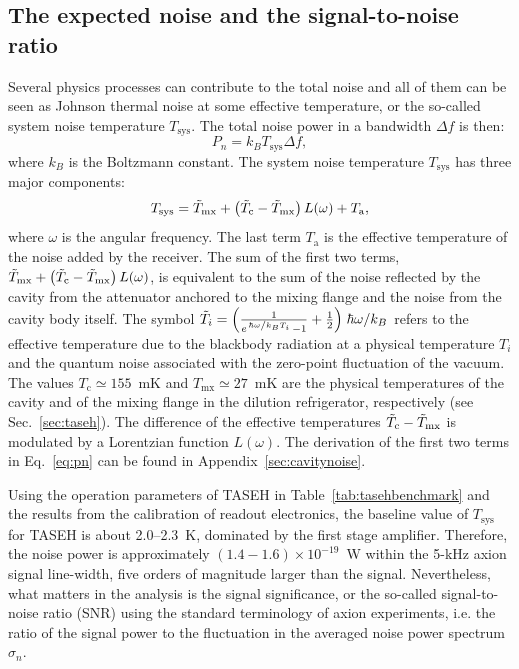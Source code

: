 \documentclass[%
reprint, %
superscriptaddress,
 amsmath,amssymb,
 aps
]{revtex4-2}
\begin{document}
\subsection{The expected noise and the signal-to-noise ratio}
\label{sec:intronoise}
Several physics processes can contribute to the total noise and all of them 
can be seen as Johnson thermal noise at some effective temperature, or the 
so-called system noise temperature $T_\text{sys}$. The total noise power in a 
bandwidth $\Delta f$ is then:
\begin{equation}
  P_n = k_B T_\text{sys} \Delta f, 
\end{equation}
where $k_B$ is the Boltzmann constant. 
The system noise temperature $T_\text{sys}$ has three major components: 
\begin{equation}
 T_\text{sys} = \Tilde{T}_\text{mx} + \left(\Tilde{T}_\text{c}-\Tilde{T}_\text{mx}\right)L(\omega) + T_\text{a},
\label{eq:pn}
\end{equation}
where $\omega$ is the angular frequency. 
The last term $T_\text{a}$ is the effective temperature of the 
noise added by the receiver. 
The sum of the first two terms, 
$\Tilde{T}_\text{mx} + \left(\Tilde{T}_\text{c}-\Tilde{T}_\text{mx}\right)L(\omega)$, %
is equivalent to the sum of the noise reflected by the cavity from the 
attenuator anchored to the mixing flange and the noise from the cavity body 
itself. The symbol 
$\Tilde{T}_i=\left(\frac{1}{e^{\left.\hbar\omega\middle/k_BT_i\right.}-1} + \frac{1}{2}\right)\left. \hbar\omega\middle/k_B\right.$ refers to the effective 
temperature due to the blackbody radiation at a physical temperature $T_i$ and 
the quantum noise associated with the zero-point fluctuation of the vacuum. 
The values $T_\text{c}\simeq155$~mK and $T_\text{mx}\simeq27$~mK are the 
physical temperatures of the cavity and of the mixing flange in the dilution 
refrigerator, respectively (see Sec.~\ref{sec:taseh}). The difference 
of the effective temperatures $\Tilde{T}_\text{c}-\Tilde{T}_\text{mx}$ is 
modulated by a Lorentzian function $L(\omega)$. 
The derivation of the first two terms in Eq.~\eqref{eq:pn} can be found in 
Appendix~\ref{sec:cavitynoise}. 


Using the operation parameters of TASEH in Table~\ref{tab:tasehbenchmark} and 
the results from the calibration of readout electronics, 
the baseline value of $T_\text{sys}$ for TASEH 
is about 2.0--2.3~K, dominated by the first stage amplifier. Therefore, 
the noise power is approximately 
$\left(1.4-1.6\right)\times 10^{-19}$~W within the 5-kHz axion signal 
line-width, five orders of magnitude larger than the signal. Nevertheless, what
 matters in the analysis is the signal significance, or the so-called 
signal-to-noise ratio (SNR) using the standard terminology of axion 
experiments, i.e. the ratio of the signal power to the fluctuation in the 
averaged noise power spectrum $\sigma_n$. 
\end{document}
